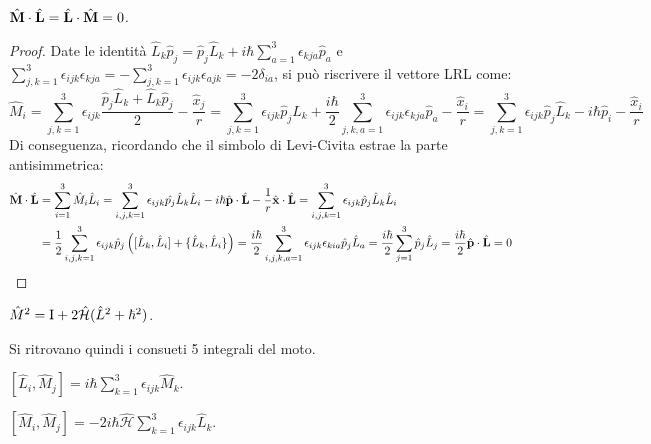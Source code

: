 \begin{proposition}
	$ \hat{\mathbf{M}}\cdot\hat{\mathbf{L}} = \hat{\mathbf{L}}\cdot\hat{\mathbf{M}} = 0 $.
\end{proposition}
\begin{proof}
	Date le identità $ \hat{L}_k \hat{p}_j = \hat{p}_j \hat{L}_k + i\hbar \sum_{a = 1}^{3} \epsilon_{kja} \hat{p}_a $ e $ \sum_{j,k = 1}^{3} \epsilon_{ijk} \epsilon_{kja} = - \sum_{j,k = 1}^{3} \epsilon_{ijk} \epsilon_{ajk} = -2\delta_{ia} $, si può riscrivere il vettore LRL come:
	\begin{equation*}
		\hat{M}_i = \sum_{j,k = 1}^{3} \epsilon_{ijk} \frac{\hat{p}_j \hat{L}_k + \hat{L}_k \hat{p}_j}{2} - \frac{\hat{x}_j}{r} = \sum_{j,k = 1}^{3} \epsilon_{ijk} \hat{p}_j \hat{L}_k + \frac{i\hbar}{2} \sum_{j,k,a = 1}^{3} \epsilon_{ijk} \epsilon_{kja} \hat{p}_a - \frac{\hat{x}_i}{r} = \sum_{j,k = 1}^{3} \epsilon_{ijk} \hat{p}_j \hat{L}_k - i\hbar \hat{p}_i - \frac{\hat{x}_i}{r}
	\end{equation*}
	Di conseguenza, ricordando che il simbolo di Levi-Civita estrae la parte antisimmetrica:
	\begin{equation*}
		\begin{split}
			\hat{\mathbf{M}}\cdot\hat{\mathbf{L}}
			&= \sum_{i = 1}^{3} \hat{M}_i \hat{L}_i = \sum_{i,j,k = 1}^{3} \epsilon_{ijk} \hat{p_j} \hat{L}_k \hat{L}_i - i\hbar \hat{\mathbf{p}} \cdot \hat{\mathbf{L}} - \frac{1}{r} \hat{\mathbf{x}} \cdot \hat{\mathbf{L}} = \sum_{i,j,k = 1}^{3} \epsilon_{ijk} \hat{p}_j \hat{L}_k \hat{L}_i \\
			&= \frac{1}{2} \sum_{i,j,k = 1}^{3} \epsilon_{ijk} \hat{p}_j \left( [\hat{L}_k, \hat{L}_i] + \{\hat{L}_k, \hat{L}_i\} \right) = \frac{i\hbar}{2} \sum_{i,j,k,a = 1}^{3} \epsilon_{ijk} \epsilon_{kia} \hat{p}_j \hat{L}_a = \frac{i\hbar}{2} \sum_{j = 1}^{3} \hat{p}_j \hat{L}_j = \frac{i\hbar}{2} \hat{\mathbf{p}} \cdot \hat{\mathbf{L}} = 0
		\end{split}
	\end{equation*}
\end{proof}

\begin{proposition}
	$ \hat{M}^2 = \mathrm{I} + 2\hat{\mathcal{H}} (\hat{L}^2 + \hbar^2) $.
\end{proposition}

Si ritrovano quindi i consueti 5 integrali del moto.

\begin{proposition}
	$ [\hat{L}_i, \hat{M}_j] = i\hbar \sum_{k = 1}^{3} \epsilon_{ijk} \hat{M}_k $.
\end{proposition}

\begin{proposition}
	$ [\hat{M}_i, \hat{M}_j] = -2i\hbar \hat{\mathcal{H}} \sum_{k = 1}^{3} \epsilon_{ijk} \hat{L}_k $.
\end{proposition}










